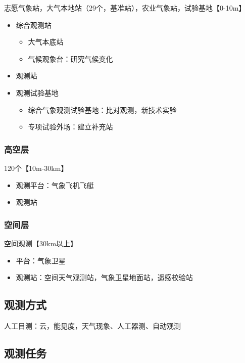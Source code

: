 ﻿\documentclass[UTF8,11pt]{ctexbook}%
\begin{document}
志愿气象站，大气本地站（29个，基准站），农业气象站，试验基地【0-10m】

\begin{itemize}
	\item 综合观测站
	\begin{itemize}
		\item 大气本底站
		\item 气候观象台：研究气候变化
	\end{itemize}
	\item 观测站
	\item 观测试验基地
	\begin{itemize}
		\item 综合气象观测试验基地：比对观测，新技术实验
		\item 专项试验外场：建立补充站
	\end{itemize}
\end{itemize}

\subsubsection{高空层}

120个【10m-30km】

\begin{itemize}
	\item 观测平台：气象飞机飞艇
	\item 观测站
\end{itemize}

\subsubsection{空间层}

空间观测【30km以上】

\begin{itemize}
	\item 平台：气象卫星
	\item 观测站：空间天气观测站，气象卫星地面站，遥感校验站
\end{itemize}

\subsection{观测方式}

人工目测：云，能见度，天气现象、人工器测、自动观测

\subsection{观测任务}
\end{document}

